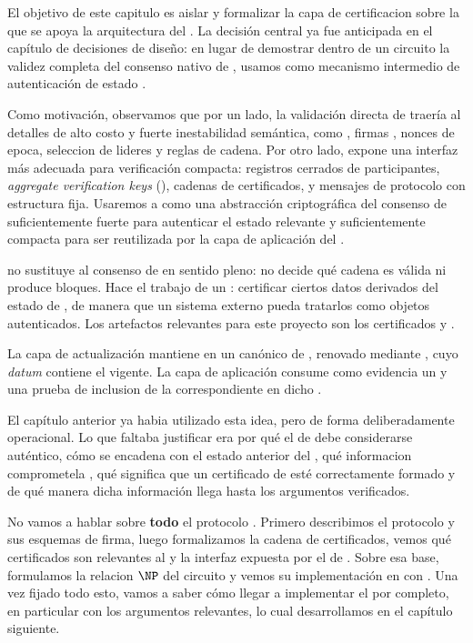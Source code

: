 
El objetivo de este capitulo es aislar y formalizar la capa de certificacion sobre la que se apoya la arquitectura del \zkBridge. La decisión central ya fue anticipada en el capítulo de decisiones de diseño: en lugar de demostrar dentro de un circuito \ZK la validez completa del consenso nativo de \Cardano, usamos \Mithril como mecanismo intermedio de autenticación de estado \cite{cryptoeprint:2021/916,MithrilDocsOverview}.

Como motivación, observamos que por un lado, la validación directa de \Praos traería al \zkBridge detalles de alto costo y fuerte inestabilidad semántica, como \VRF, firmas \KES, nonces de epoca, seleccion de lideres y reglas de cadena. Por otro lado, \Mithril expone una interfaz más adecuada para verificación compacta: registros cerrados de participantes, \textit{aggregate verification keys} (\AVK), cadenas de certificados, y mensajes de protocolo con estructura fija. Usaremos a \Mithril como una abstracción criptográfica del consenso de \Cardano suficientemente fuerte para autenticar el estado relevante y suficientemente compacta para ser reutilizada por la capa de aplicación del \zkBridge.

\Mithril no sustituye al consenso de \Cardano en sentido pleno: no decide qué cadena es válida ni produce bloques. Hace el trabajo de un \LightClient: certificar ciertos datos derivados del estado de \Cardano, de manera que un sistema externo pueda tratarlos como objetos autenticados. Los artefactos relevantes para este proyecto son los certificados \StakeDistribution y \TransactionSnapshot \cite{MithrilDocsCertChain,MithrilDocsClient}.

La capa de actualización mantiene en \ChainB un \UTxO canónico de \StakeDistribution, renovado mediante \StakeDistTx, cuyo \textit{datum} contiene el \StakeDistributionCertificate vigente. La capa de aplicación consume como evidencia un \TransactionSnapshotCertificate y una prueba de inclusion de la \LockTx correspondiente en dicho \TransactionSnapshotCertificate.

El capítulo anterior ya habia utilizado esta idea, pero de forma deliberadamente operacional. Lo que faltaba justificar era por qué el \UTxO de \StakeDistribution debe considerarse auténtico, cómo se encadena con el estado anterior del \UTxO, qué informacion comprometela \AVK, qué significa que un certificado de \Mithril esté correctamente formado y de qué manera dicha información llega hasta los argumentos \ZK verificados.

No vamos a hablar sobre \textbf{todo} el protocolo \Mithril. Primero describimos el protocolo \STM y sus esquemas de firma, luego formalizamos la cadena de certificados, vemos qué certificados son relevantes al \zkBridge y la interfaz expuesta por el \MithrilAggregator de \Mithril. Sobre esa base, formulamos la relacion $\NP$ del circuito \STM y vemos su implementación en \HaloTwo con \KZG. Una vez fijado todo esto, vamos a saber cómo llegar a implementar el \zkBridge por completo, en particular con los argumentos \ZK relevantes, lo cual desarrollamos en el capítulo siguiente.
